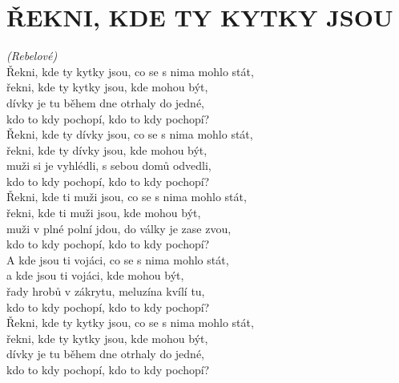 \section*{\Huge ŘEKNI, KDE TY KYTKY JSOU}
\emph{(Rebelové)}\\

Řekni, kde ty kytky jsou, co se s nima mohlo stát,\\
řekni, kde ty kytky jsou, kde mohou být,\\
dívky je tu během dne otrhaly do jedné,\\
kdo to kdy pochopí, kdo to kdy pochopí?\\

Řekni, kde ty dívky jsou, co se s nima mohlo stát,\\
řekni, kde ty dívky jsou, kde mohou být,\\
muži si je vyhlédli, s sebou domů odvedli,\\
kdo to kdy pochopí, kdo to kdy pochopí?\\

Řekni, kde ti muži jsou, co se s nima mohlo stát,\\
řekni, kde ti muži jsou, kde mohou být,\\
muži v plné polní jdou, do války je zase zvou,\\
kdo to kdy pochopí, kdo to kdy pochopí?\\

A kde jsou ti vojáci, co se s nima mohlo stát,\\
a kde jsou ti vojáci, kde mohou být,\\
řady hrobů v zákrytu, meluzína kvílí tu,\\
kdo to kdy pochopí, kdo to kdy pochopí?\\

Řekni, kde ty kytky jsou, co se s nima mohlo stát,\\
řekni, kde ty kytky jsou, kde mohou být,\\
dívky je tu během dne otrhaly do jedné,\\
kdo to kdy pochopí, kdo to kdy pochopí?

\newpage
